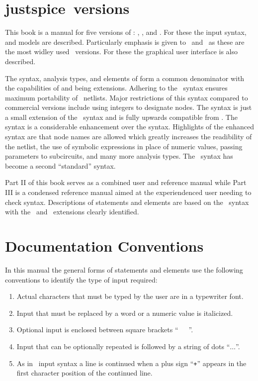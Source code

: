 {
\section{justspice\ versions}

This book is a manual for five versions of \justspice: \spicetwo,
\spicethree , \pspice and \hspice . For these the input syntax,
and models are described.
Particularly emphasis is given to \spicethree\ and \pspice\ as these are the
most widley used \justspice\ versions.
For these the graphical user interface is also described.

The syntax, analysis types, and elements of
\spicetwo form a common denominator with the capabilities of
\spicethree and \pspice being extensions.
Adhering to the \spicetwo\ syntax ensures maximum portability of
\spice\ netlists.  Major restrictions of this syntax compared to commercial
versions include using integers to designate nodes.
The \spicethree syntax is just a small extension
of the \spicetwo\ syntax and is fully upwards compatible from \spicetwo.
The \pspice syntax is a considerable enhancement over the \spicetwo syntax.
Highlights of the enhanced syntax are that node names are allowed which
greatly increases the readibility of the netlist, the use of
symbolic expressions in place of numeric values, passing parameters
to subcircuits, and many more analysis
types.  The \pspice\ syntax has become a second ``standard'' syntax.

Part II of this book serves as a combined user and reference manual while
Part III is a condensed reference manual aimed at the experiendenced user
needing to check syntax.
Descriptions of statements and elements are based on the \spicetwo\ syntax
with the \spicethree\ and \pspice\ extensions clearly identified.

\section{Documentation Conventions}

In this manual the general forms of statements and elements use the following
conventions to identify the type of input required:
\begin{enumerate}
\item Actual characters that must be typed by the user are in a typewriter
      font.
\item Input that must be replaced by a word or a numeric value is italicized.
\item Optional input is enclosed between square brackets ``\B\ \ \ \E''.
\item Input that can be optionally repeated is followed by a string of
      dots ``$\ldots$''.
\item As in \justspice\ input syntax a line is continued when a plus sign
      ``{\tt +}'' appears in the first character position of the continued line.
\end{enumerate}

}
